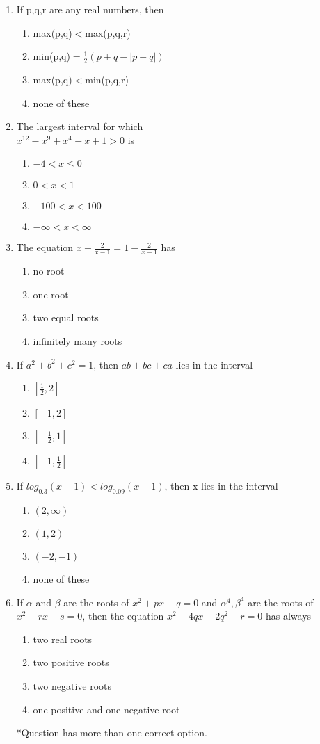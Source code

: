 \begin{enumerate}[label=\arabic*.,ref=\thesubsection.\theenumi]
\item If p,q,r are any real numbers, then
\begin{enumerate}
\item max(p,q)$<$max(p,q,r)
\item min(p,q)$=\frac{1}{2}(p+q-|p-q|)$ 
\item max(p,q)$<$min(p,q,r)
\item none of these 
\end{enumerate}

\item The largest interval for which\\ $x^{12}-x^{9}+x^{4}-x+1>0$ is 
\begin{enumerate}
\item $-4<x\leq0$
\item $0<x<1$ 
\item $-100<x<100$
\item $-\infty<x<\infty$ 
\end{enumerate}

\item The equation $x-\frac{2}{x-1}=1-\frac{2}{x-1}$ has
\begin{enumerate}
\item no root
\item one root 
\item two equal roots
\item infinitely many roots
\end{enumerate}

\item If $a^{2}+b^{2}+c^{2}=1$, then $ab+bc+ca$ lies in the interval
\begin{enumerate}
\item $[\frac{1}{2},2]$
\item $[-1,2]$ 
\item $[-\frac{1}{2},1]$
\item $[-1,\frac{1}{2}]$
\end{enumerate}

\item If $log_{0.3}(x-1)<log_{0.09}(x-1)$, then x lies in the interval
\begin{enumerate}
\item $(2,\infty)$
\item $(1,2)$ 
\item $(-2,-1)$
\item none of these 
\end{enumerate}

\item If $\alpha$ and $\beta$ are the roots of $x^{2}+px+q=0 $ and $ \alpha^{4},\beta^{4}$ are the roots of $x^{2}-rx+s=0$, then the equation $x^{2}-4qx+2q^{2}-r=0$ has always
\begin{enumerate}
\item two real roots
\item two positive roots
\item two negative roots
\item one positive and one negative root 
\end{enumerate}
*Question has more than one correct option.


\end{enumerate}
